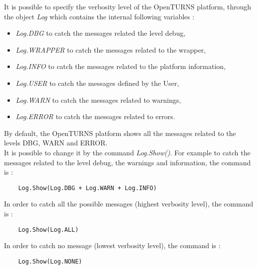 \renewcommand{\filename}{docUC_Intro_VerbosityLevel}
\renewcommand{\filetitle}{Verbosity level of the OpenTURNS platform}

\HeaderNNIILevel


It is possible to specify the verbosity level of the OpenTURNS platform, through the object {\itshape Log} which contains the internal following variables :
\begin{itemize}
\item {\itshape Log.DBG} to catch the messages related the level debug,
\item {\itshape Log.WRAPPER} to catch the messages related to the wrapper,
\item {\itshape Log.INFO} to catch the messages related to the platform information,
\item {\itshape Log.USER} to catch the messages defined by the User,
\item {\itshape Log.WARN} to catch the messages related to warnings,
\item {\itshape Log.ERROR} to catch the messages related to errors.
\end{itemize}
By default, the OpenTURNS platform shows all the messages related to the levels DBG, WARN and ERROR.\\
It is possible to change it by the command {\itshape Log.Show()}. For example to catch the messages related to the level debug, the warnings and information, the command is :
\begin{center}
  \begin{lstlisting}
    Log.Show(Log.DBG + Log.WARN + Log.INFO)
  \end{lstlisting}
\end{center}
In order to catch all the possible messages (highest verbosity level), the command is :
\begin{center}
  \begin{lstlisting}
    Log.Show(Log.ALL)
  \end{lstlisting}
\end{center}
In order to catch no message (lowest verbosity level), the command is :
\begin{center}
  \begin{lstlisting}
    Log.Show(Log.NONE)
  \end{lstlisting}
\end{center}
